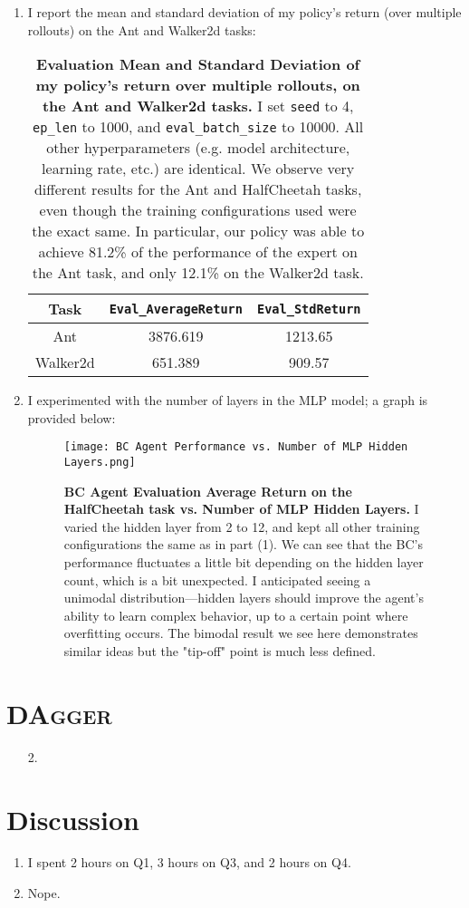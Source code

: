 \documentclass[12pt]{article}
\begin{document}
\begin{enumerate}
  \item I report the mean and standard deviation of my policy's return (over multiple rollouts) on the Ant and Walker2d tasks:
  \begin{table}[h!]
    \begin{center}
    \begin{tabular}{|c|c|c|}
      \hline
      Task & \texttt{Eval\_AverageReturn} & \texttt{Eval\_StdReturn} \\
      \hline
      Ant & 3876.619 & 1213.65 \\ 
      Walker2d & 651.389 & 909.57 \\
      \hline
    \end{tabular}
    \caption{\textbf{Evaluation Mean and Standard Deviation of my policy's return over multiple rollouts, on the Ant and Walker2d tasks.}
    I set \texttt{seed} to 4, \texttt{ep\_len} to 1000, and \texttt{eval\_batch\_size} to 10000. All other hyperparameters (e.g. model architecture, learning rate, etc.) are identical.
    We observe very different results for the Ant and HalfCheetah tasks, even though the training configurations used were the exact same. In particular, our policy was able to achieve 81.2\% of the performance of the expert on the Ant task, and only 12.1\% on the Walker2d task.}
  \end{center}
  \end{table}

  \item I experimented with the number of layers in the MLP model; a graph is provided below:
  \begin{figure}[h!]
    \begin{center}
    \texttt{[image: BC Agent Performance vs. Number of MLP Hidden Layers.png]}
    \caption{\textbf{BC Agent Evaluation Average Return on the HalfCheetah task vs. Number of MLP Hidden Layers.} I varied the hidden layer from 2 to 12, and kept all other training configurations the same as in part (1). We can see that the BC's performance fluctuates a little bit depending on the hidden layer count, which is a bit unexpected. I anticipated seeing a unimodal distribution—hidden layers should improve the agent's ability to learn complex behavior, up to a certain point where overfitting occurs. The bimodal result we see here demonstrates similar ideas but the "tip-off" point is much less defined.}
  \end{center}
  \end{figure}
\end{enumerate}

\section{\textsc{DAgger}}

\begin{itemize}
  \item [2.]
\end{itemize}

\section{Discussion}

\begin{enumerate}
  \item I spent 2 hours on Q1, 3 hours on Q3, and 2 hours on Q4.
  \item Nope.
\end{enumerate}
\end{document}
